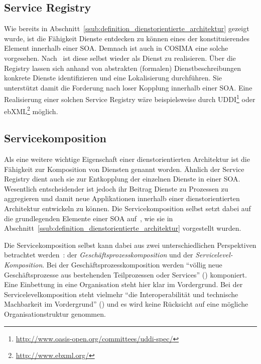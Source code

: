 \subsection{Service Registry} %
\label{sub:service_registry}

  Wie bereits in Abschnitt~\ref{ssub:definition_dienstorientierte_architektur} gezeigt wurde, ist die Fähigkeit Dienste entdecken zu können eines der konstituierendes Element innerhalb einer SOA. Demnach ist auch in COSIMA eine solche vorgesehen. Nach~\citep{service_oriented_computing} ist diese selbst wieder als Dienst zu realisieren. Über die Registry lassen sich anhand von abstrakten (formalen) Dienstbeschreibungen konkrete Dienste identifizieren und eine Lokalisierung durchführen. Sie unterstützt damit die Forderung nach loser Kopplung innerhalb einer SOA. Eine Realisierung einer solchen Service Registry wäre beispielsweise durch UDDI\footnote{\url{http://www.oasis-open.org/committees/uddi-spec/}} oder ebXML\footnote{\url{http://www.ebxml.org/}} möglich.


\subsection{Servicekomposition} %
\label{sub:service_komposition}

  Als eine weitere wichtige Eigenschaft einer dienstorientierten Architektur ist die Fähigkeit zur Komposition von Diensten genannt worden. Ähnlich der Service Registry dient auch sie zur Entkopplung der einzelnen Dienste in einer SOA. Wesentlich entscheidender ist jedoch ihr Beitrag Dienste zu Prozessen zu aggregieren und damit neue Applikationen innerhalb einer dienstorientierten Architektur entwickeln zu können. Die Servicekomposition selbst setzt dabei auf die grundlegenden Elemente einer SOA auf~\citep[S. 51]{milanovic2004csw}, wie sie in Abschnitt~\ref{ssub:definition_dienstorientierte_architektur} vorgestellt wurden.
    
  Die Servicekomposition selbst kann dabei aus zwei unterschiedlichen Perspektiven betrachtet werden~\citep[S. 104]{masak2007ssb}: der \emph{Geschäftsprozesskomposition} und der \emph{Servicelevel-Komposition}. Bei der Geschäftsprozesskomposition werden "`völlig neue Geschäftsprozesse aus bestehenden Teilprozessen oder Services"' (\citep[S. 104]{masak2007ssb}) komponiert. Eine Einbettung in eine Organisation steht hier klar im Vordergrund. Bei der Servicelevelkomposition steht vielmehr "`die Interoperabilität und technische Machbarkeit im Vordergrund"' (\citep[S. 105]{masak2007ssb}) und es wird keine Rücksicht auf eine mögliche Organisationstruktur genommen.
  
